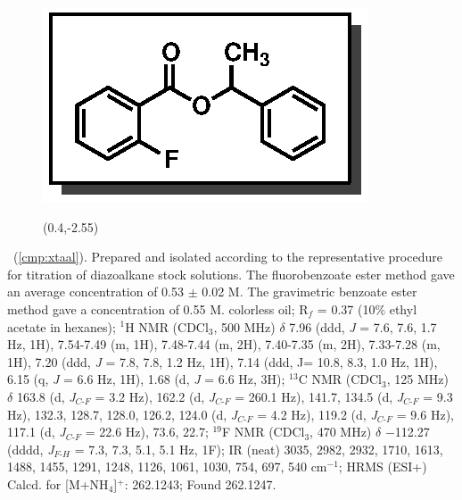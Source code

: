 \pagebreak
\begin{figure}
  \vspace{-18pt}
  \begin{center}
    \includegraphics[scale=0.8]{chp_asymmetric/images/xtaal}
          \begin{textblock}{1}(0.4,-2.55)  \end{textblock}
  \end{center}
  \vspace{-35pt}
\end{figure}\noindent \textbf{\CMPxtaal}\ (\ref{cmp:xtaal}). Prepared and
isolated according to the representative procedure for titration of diazoalkane
stock solutions. The fluorobenzoate ester method gave an average concentration
of 0.53 $\pm$ 0.02 M. The gravimetric benzoate ester method gave a concentration
of 0.55 M. colorless oil; R$_f$ = 0.37 (10\% ethyl acetate in hexanes); $^1$H
NMR (CDCl$_3$, 500 MHz) $\delta$ 7.96 (ddd, \textit{J} = 7.6, 7.6, 1.7 Hz, 1H),
7.54-7.49 (m, 1H), 7.48-7.44 (m, 2H), 7.40-7.35 (m, 2H), 7.33-7.28 (m, 1H), 7.20
(ddd, \textit{J} = 7.8, 7.8, 1.2 Hz, 1H), 7.14 (ddd, J= 10.8, 8.3, 1.0 Hz, 1H),
6.15 (q, \textit{J} = 6.6 Hz, 1H), 1.68 (d, \textit{J} = 6.6 Hz, 3H); $^{13}$C
NMR (CDCl$_3$, 125 MHz) $\delta$ 163.8 (d, \textit{J}$_{C\mbox{-}F}$ = 3.2 Hz),
162.2 (d, \textit{J}$_{C\mbox{-}F}$ = 260.1 Hz), 141.7, 134.5 (d,
\textit{J}$_{C\mbox{-}F}$ = 9.3 Hz), 132.3, 128.7, 128.0, 126.2, 124.0 (d, \textit{J}$_{C\mbox{-}F}$ = 4.2 Hz), 119.2 (d,
\textit{J}$_{C\mbox{-}F}$ = 9.6 Hz), 117.1 (d, \textit{J}$_{C\mbox{-}F}$ = 22.6
Hz), 73.6, 22.7; $^{19}$F NMR (CDCl$_3$, 470 MHz) $\delta$ $-$112.27 (dddd,
\textit{J}$_{F\mbox{-}H}$ = 7.3, 7.3, 5.1, 5.1 Hz, 1F); IR (neat) 3035, 2982,
2932, 1710, 1613, 1488, 1455, 1291, 1248, 1126, 1061, 1030, 754, 697, 540
cm$^{-1}$; HRMS (ESI+) Calcd. for  [M+NH$_4$]$^+$: 262.1243;
Found 262.1247.

